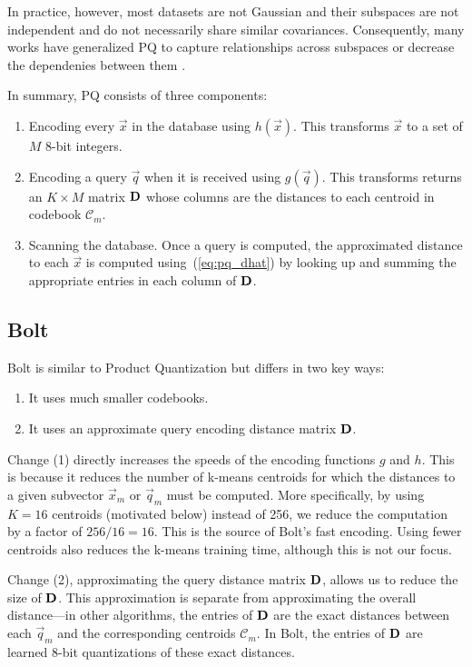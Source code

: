 In practice, however, most datasets are not Gaussian and their subspaces are not independent and do not necessarily share similar covariances. Consequently, many works have generalized PQ to capture relationships across subspaces or decrease the dependenies between them \cite{opq, cartesianKmeans, aq, otq, lsq}.

In summary, PQ consists of three components:
\begin{enumerate}
    \item Encoding every $\vec{x}$ in the database using $h(\vec{x})$. This transforms $\vec{x}$ to a set of $M$ 8-bit integers.
    \item Encoding a query $\vec{q}$ when it is received using $g(\vec{q})$. This transforms returns an $K \times M$ matrix $\mathbf{D}$ whose columns are the distances to each centroid in codebook $\mathcal{C}_m$.
    \item Scanning the database. Once a query is computed, the approximated distance to each $\vec{x}$ is computed using~(\ref{eq:pq_dhat}) by looking up and summing the appropriate entries in each column of $\mathbf{D}$.
\end{enumerate}

\subsection{Bolt}

Bolt is similar to Product Quantization but differs in two key ways:
\begin{enumerate}
\item It uses much smaller codebooks.
\item It uses an approximate query encoding distance matrix $\mathbf{D}$.
\end{enumerate}

Change (1) directly increases the speeds of the encoding functions $g$ and $h$. This is because it reduces the number of k-means centroids for which the distances to a given subvector $\vec{x}_m$ or $\vec{q}_m$ must be computed. More specifically, by using $K = 16$ centroids (motivated below) instead of 256, we reduce the computation by a factor of $256 / 16 = 16$. This is the source of Bolt's fast encoding. Using fewer centroids also reduces the k-means training time, although this is not our focus.

Change (2), approximating the query distance matrix $\mathbf{D}$, allows us to reduce the size of $\mathbf{D}$. This approximation is separate from approximating the overall distance---in other algorithms, the entries of $\mathbf{D}$ are the exact distances between each $\vec{q}_m$ and the corresponding centroids $\mathcal{C}_m$. In Bolt, the entries of $\mathbf{D}$ are learned 8-bit quantizations of these exact distances.

